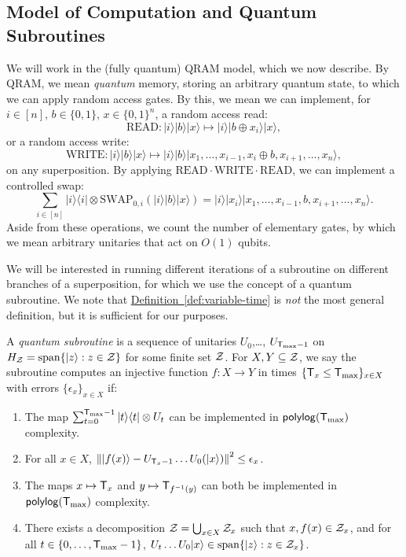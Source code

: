 \documentclass{theoretics}
\newcommand{\defin}[1]{\hyperref[def:#1]{Definition~\ref*{def:#1}}}
\def\ket#1{{\lvert}#1\rangle}
\def\bra#1{{\langle}#1\rvert}
\renewcommand{\>}{\rangle}
\newcommand{\<}{\langle}
\renewcommand{\(}{\left(}
\renewcommand{\)}{\right)}
\def\norm#1{\left\| #1 \right\|}
\begin{document}
\subsection{Model of Computation and Quantum Subroutines}\label{sec:model}

We will work in the (fully quantum) QRAM model, which we now describe. By QRAM, we mean \emph{quantum} memory, storing an arbitrary quantum state, to which we can apply random access gates. By this, we mean we can implement, for $i\in [n]$, $b\in\{0,1\}$, $x\in \{0,1\}^n$, a random access read:
$$\text{READ}:\ket{i}\ket{b}\ket{x} \mapsto \ket{i}\ket{b\oplus x_i}\ket{x},$$
or a random access write:
$$\text{WRITE}:\ket{i}\ket{b}\ket{x} \mapsto \ket{i}\ket{b}\ket{x_1,\dots,x_{i-1},x_i\oplus b,x_{i+1},\dots,x_n},$$
on any superposition.
By applying $\text{READ}\cdot\text{WRITE}\cdot\text{READ}$, we can implement a controlled swap:
$$\sum_{i\in [n]}\ket{i}\bra{i}\otimes \text{SWAP}_{0,i}(\ket{i}\ket{b}\ket{x}) = \ket{i}\ket{x_i}\ket{x_1,\dots,x_{i-1},b,x_{i+1},\dots,x_n}.$$
Aside from these operations, we count the number of elementary gates, by which we mean arbitrary unitaries that act on $O(1)$ qubits. 


We will be interested in running different iterations of a subroutine on different branches of a superposition, for which we use the concept of a quantum subroutine. We note that \defin{variable-time} is \emph{not} the most general definition, but it is sufficient for our purposes. 

\begin{definition}\label{def:variable-time}
A \emph{quantum subroutine} is a sequence of unitaries $U_0$,\dots, $U_{{\sf T}_{\max}-1}$ on 
$H_{\cal Z}=\mathrm{span}\{\ket{z}:z\in{\cal Z}\}$
for some finite set ${\cal Z}$. For $X,Y\subseteq{\cal Z}$, we say the subroutine computes an injective function $f:X\rightarrow Y$ in times $\{{\sf T}_x\leq {\sf T}_{\max}\}_{x\in X}$ with errors $\{\epsilon_x\}_{x\in X}$ if:
\begin{enumerate}
\item The map $\sum_{t=0}^{{\sf T}_{\max}-1}\ket{t}\bra{t}\otimes U_t$ can be implemented in ${\sf polylog}({\sf T}_{\max})$ complexity.\label{item:select}
\item For all $x\in X$, $\norm{\ket{f(x)} - U_{{\sf T}_x-1}\dots U_0(\ket{x})}^2\leq \epsilon_x$. \label{item:error}
\item The maps $x\mapsto {\sf T}_x$ and $y\mapsto {\sf T}_{f^{-1}(y)}$ can both be implemented in ${\sf polylog}({\sf T}_{\max})$ complexity.\label{item:known-times}
\item There exists a decomposition ${\cal Z}=\bigcup_{x\in X} {\cal Z}_x$ such that $x,f(x)\in {\cal Z}_x$, and for all $t\in \{0,\dots,{\sf T}_{\max}-1\}$, $U_t\dots U_0\ket{x}\in \mathrm{span}\{\ket{z}:z\in {\cal Z}_x\}$. \label{item:non-confusion}

\end{enumerate}
\end{definition}
\end{document}
